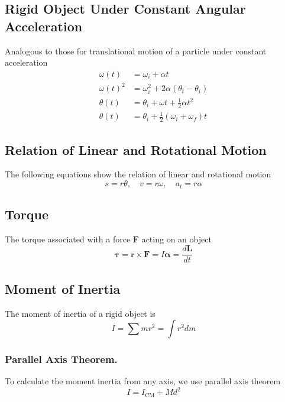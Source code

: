 \documentclass[../../../main.tex]{subfiles}
\begin{document}
\subsection*{Rigid Object Under Constant Angular Acceleration} Analogous to those for translational motion of a particle under constant acceleration
\begin{align*}
    \omega(t)&=\omega_i+\alpha t\\
    \omega(t)^2&=\omega_i^2+2\alpha(\theta_t-\theta_i)\\
    \theta(t)&=\theta_i +\omega t+\frac{1}{2}\alpha t^2\\
    \theta(t)&=\theta_i+\frac{1}{2}(\omega_i+\omega_f)t
\end{align*}

\subsection*{Relation of Linear and Rotational Motion}
The following equations show the relation of linear and rotational motion
\begin{equation*}
    s=r\theta,\quad v=r\omega,\quad a_t=r\alpha
\end{equation*}

\subsection*{Torque}
The torque associated with a force $\mathbf{F}$ acting on an object
\begin{equation*}
    \boldsymbol{\tau}=\mathbf{r}\times\mathbf{F}=I \mathbf{\alpha} =\frac{d\mathbf{L}}{dt}
\end{equation*}

\subsection*{Moment of Inertia}
The moment of inertia of a rigid object is 
\begin{equation*}
    I=\sum mr^2=\int r^2 dm
\end{equation*}

\subsubsection*{Parallel Axis Theorem.} To calculate the moment inertia from any axis, we use parallel axis theorem 
\begin{equation*}
    I=I_\text{CM}+Md^2
\end{equation*}
\end{document}
